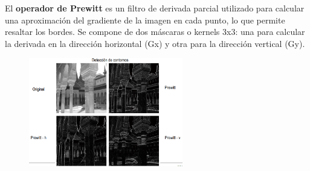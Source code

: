 El \textbf{operador de Prewitt} es un filtro de derivada parcial utilizado para calcular una aproximación del gradiente de la imagen en cada punto, lo que permite resaltar los bordes. Se compone de dos máscaras o kernels 3x3: una para calcular la derivada en la dirección horizontal (Gx) y otra para la dirección vertical (Gy).

\begin{figure}[h]
\centering
\includegraphics[width = 0.6\textwidth]{figs/prewitt.png}
\end{figure}
